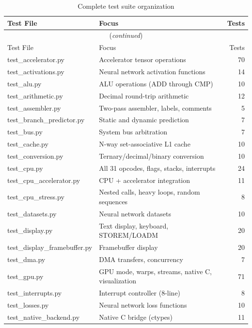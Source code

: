 \documentclass[12pt,a4paper,twoside]{book}
\theoremstyle{trinarytheorem}
\theoremstyle{trinarydefinition}
\newcommand{\code}[1]{\textsf{#1}}
\begin{document}
\begin{longtable}{llr}
\caption{Complete test suite organization}
\label{tab:testsuite} \\
\toprule
Test File & Focus & Tests \\
\midrule
\endfirsthead
\multicolumn{3}{c}{(\emph{continued})} \\
\toprule
Test File & Focus & Tests \\
\midrule
\endhead
\bottomrule
\endfoot
\code{test\_accelerator.py} & Accelerator tensor operations & 70 \\
\code{test\_activations.py} & Neural network activation functions & 14 \\
\code{test\_alu.py} & ALU operations (ADD through CMP) & 10 \\
\code{test\_arithmetic.py} & Decimal round-trip arithmetic & 12 \\
\code{test\_assembler.py} & Two-pass assembler, labels, comments & 5 \\
\code{test\_branch\_predictor.py} & Static and dynamic prediction & 7 \\
\code{test\_bus.py} & System bus arbitration & 7 \\
\code{test\_cache.py} & N-way set-associative L1 cache & 10 \\
\code{test\_conversion.py} & Ternary/decimal/binary conversion & 10 \\
\code{test\_cpu.py} & All 31 opcodes, flags, stacks, interrupts & 24 \\
\code{test\_cpu\_accelerator.py} & CPU + accelerator integration & 11 \\
\code{test\_cpu\_stress.py} & Nested calls, heavy loops, random sequences & 8 \\
\code{test\_datasets.py} & Neural network datasets & 10 \\
\code{test\_display.py} & Text display, keyboard, STOREM/LOADM & 20 \\
\code{test\_display\_framebuffer.py} & Framebuffer display & 20 \\
\code{test\_dma.py} & DMA transfers, concurrency & 7 \\
\code{test\_gpu.py} & GPU mode, warps, streams, native C, visualization & 71 \\
\code{test\_interrupts.py} & Interrupt controller (8-line) & 8 \\
\code{test\_losses.py} & Neural network loss functions & 10 \\
\code{test\_native\_backend.py} & Native C bridge (ctypes) & 11 \\

\end{longtable}
\end{document}
